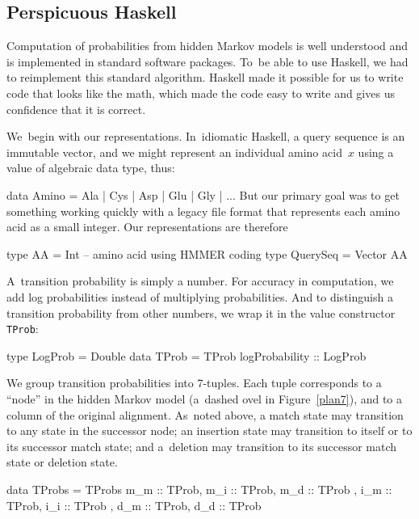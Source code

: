 \documentclass[preprint,nonatbib,blockstyle,nocopyrightspace,times]{sigplanconf}
\newcommand\figref[1]{Figure~\ref{#1}}
\newenvironment{smallverbatim}{\par\small\verbatim}{\endverbatim}
\begin{document}
\subsection{Perspicuous Haskell}

Computation of probabilities from hidden Markov models is well
understood and is implemented in standard software packages.
To~be able to use Haskell, we had to reimplement this standard
algorithm.
Haskell made it possible for us to write code that looks like the
math,
which made the code easy to write and gives us confidence that it is
correct.


We~begin with our representations.
In~idiomatic Haskell, a query sequence is an immutable vector, and
we might represent an individual amino acid~$x$
using a value of algebraic data type, thus:
\begin{smallverbatim}
data Amino = Ala | Cys | Asp | Glu | Gly | ...
\end{smallverbatim}
But our primary goal was to get something working quickly with a
legacy file format that represents each amino acid as a small integer.
Our representations are therefore
\begin{smallverbatim}
type AA       = Int -- amino acid using HMMER coding
type QuerySeq = Vector AA
\end{smallverbatim}

A~transition probability is simply a number.
For accuracy in computation, we add log probabilities instead of
multiplying probabilities.
And to distinguish a transition probability from other numbers, we wrap it in
the value constructor \texttt{TProb}:
\begin{smallverbatim}
type LogProb = Double
data TProb  = TProb { logProbability :: LogProb }
\end{smallverbatim}

We group transition probabilities into 7-tuples.
Each tuple corresponds to a ``node'' in the hidden Markov model
(a~dashed ovel in \figref{plan7}), and to a column of the original
alignment.
As~noted above, 
a match state may transition to any state in the successor node;
an insertion state may transition to itself or to its successor match
state;
and
a~deletion may transition to its successor match
state or deletion state.
\begin{smallverbatim}
data TProbs = 
     TProbs { m_m :: TProb, m_i :: TProb, m_d :: TProb
            , i_m :: TProb, i_i :: TProb
            , d_m :: TProb, d_d :: TProb }
\end{smallverbatim}
\end{document}
